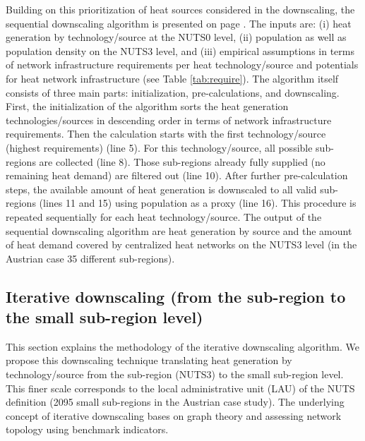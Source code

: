 Building on this prioritization of heat sources considered in the downscaling, the sequential downscaling algorithm is presented on page \pageref{Alg:1}. The inputs are: (i) heat generation by technology/source at the NUTS0 level, (ii) population as well as population density on the NUTS3 level, and (iii) empirical assumptions in terms of network infrastructure requirements per heat technology/source and potentials for heat network infrastructure (see Table \ref{tab:require}). The algorithm itself consists of three main parts: initialization, pre-calculations, and downscaling. First, the initialization of the algorithm sorts the heat generation technologies/sources in descending order in terms of network infrastructure requirements. Then the calculation starts with the first technology/source (highest requirements) (line 5). For this technology/source, all possible sub-regions are collected (line 8). Those sub-regions already fully supplied (no remaining heat demand) are filtered out (line 10). After further pre-calculation steps, the available amount of heat generation is downscaled to all valid sub-regions (lines 11 and 15) using population as a proxy (line 16). This procedure is repeated sequentially for each heat technology/source. The output of the sequential downscaling algorithm are heat generation by source and the amount of heat demand covered by centralized heat networks on the NUTS3 level (in the Austrian case 35 different sub-regions). 

\subsection{Iterative downscaling (from the sub-region to the small sub-region level)}\label{alg2}
This section explains the methodology of the iterative downscaling algorithm. We propose this downscaling technique translating heat generation by technology/source from the sub-region (NUTS3) to the small sub-region level. This finer scale corresponds to the local administrative unit (LAU) of the NUTS definition (2095 small sub-regions in the Austrian case study). The underlying concept of iterative downscaling bases on graph theory and assessing network topology using benchmark indicators. 

